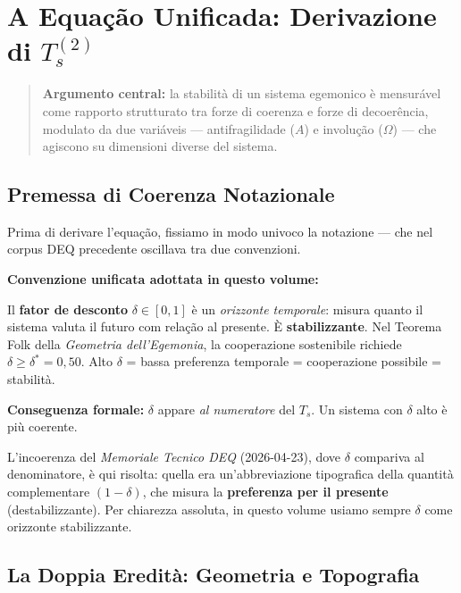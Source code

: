 \chapter{\texorpdfstring{A Equação Unificada: Derivazione di
\(T_s^{(2)}\)}{A Equação Unificada: Derivazione di T\_s\^{}\{(2)\}}}\label{lequação-unificata-derivazione-di-t_s2}

\begin{quote}
\textbf{Argumento central:} la stabilità di un sistema egemonico è
mensurável come rapporto strutturato tra forze di coerenza e forze di
decoerência, modulato da due variáveis --- antifragilidade (\(A\)) e
involução (\(\Omega\)) --- che agiscono su dimensioni diverse del
sistema.
\end{quote}



\section{Premessa di Coerenza
Notazionale}\label{premessa-di-coerenza-notazionale}

Prima di derivare l'equação, fissiamo in modo univoco la notazione ---
che nel corpus DEQ precedente oscillava tra due convenzioni.

\Hypoth{} \textbf{Convenzione unificata adottata in questo volume:}

Il \textbf{fator de desconto} \(\delta \in [0, 1]\) è un \emph{orizzonte
temporale}: misura quanto il sistema valuta il futuro com relação al
presente. È \textbf{stabilizzante}. Nel Teorema Folk della
\emph{Geometria dell'Egemonia}, la cooperazione sostenibile richiede
\(\delta \geq \delta^* = 0{,}50\). Alto \(\delta\) = bassa preferenza
temporale = cooperazione possibile = stabilità.

\Proved{} \textbf{Conseguenza formale:} \(\delta\) appare \emph{al
numeratore} del \(T_s\). Un sistema con \(\delta\) alto è più coerente.

L'incoerenza del \emph{Memoriale Tecnico DEQ} (2026-04-23), dove
\(\delta\) compariva al denominatore, è qui risolta: quella era
un'abbreviazione tipografica della quantità complementare
\((1-\delta)\), che misura la \textbf{preferenza per il presente}
(destabilizzante). Per chiarezza assoluta, in questo volume usiamo
sempre \(\delta\) come orizzonte stabilizzante.



\section{La Doppia Eredità: Geometria e
Topografia}\label{la-doppia-eredituxe0-geometria-e-topografia}

